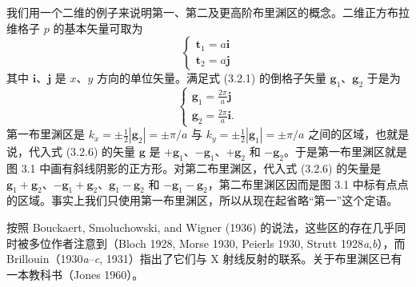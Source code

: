 我们用一个二维的例子来说明第一、第二及更高阶布里渊区的概念。二维正方布拉维格子 $p$ 的基本矢量可取为
\begin{equation*}
\left\{
\begin{array}{l}
\mathbf{t}_{1} = a\mathbf{i} \\
\mathbf{t}_{2} = a\mathbf{j}
\end{array}
\right.
\tag{3.2.9}
\end{equation*}
其中 $\mathbf{i}$、$\mathbf{j}$ 是 $x$、$y$ 方向的单位矢量。满足式 (3.2.1) 的倒格子矢量 $\mathbf{g}_{1}$、$\mathbf{g}_{2}$ 于是为
\begin{equation*}
\left\{
\begin{array}{l}
\mathbf{g}_{1} = \frac{2\pi}{a}\mathbf{j} \\
\mathbf{g}_{2} = \frac{2\pi}{a}\mathbf{i}.
\end{array}
\right.
\tag{3.2.10}
\end{equation*}
第一布里渊区是 $k_{x} = \pm\frac{1}{2}|\mathbf{g}_{2}| = \pm\pi/a$ 与 $k_{y} = \pm\frac{1}{2}|\mathbf{g}_{1}| = \pm\pi/a$ 之间的区域，也就是说，代入式 (3.2.6) 的矢量 $\mathbf{g}$ 是 $+\mathbf{g}_{1}$、$-\mathbf{g}_{1}$、$+\mathbf{g}_{2}$ 和 $-\mathbf{g}_{2}$。于是第一布里渊区就是图 3.1 中画有斜线阴影的正方形。对第二布里渊区，代入式 (3.2.6) 的矢量是 $\mathbf{g}_{1}+\mathbf{g}_{2}$、$-\mathbf{g}_{1}+\mathbf{g}_{2}$、$\mathbf{g}_{1}-\mathbf{g}_{2}$ 和 $-\mathbf{g}_{1}-\mathbf{g}_{2}$，第二布里渊区因而是图 3.1 中标有点点的区域。事实上我们只使用第一布里渊区，所以从现在起省略“第一”这个定语。

按照 Bouckaert, Smoluchowski, and Wigner (1936) 的说法，这些区的存在几乎同时被多位作者注意到（Bloch 1928, Morse 1930, Peierls 1930, Strutt 1928\textit{a},\textit{b}），而 Brillouin（1930\textit{a}--\textit{c}, 1931）指出了它们与 X 射线反射的联系。关于布里渊区已有一本教科书（Jones 1960）。
